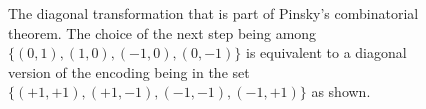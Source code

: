 \documentclass{article}
\begin{document}
\begin{figure}[h]
    \centering
    
    \caption{The diagonal transformation that is part of Pinsky's combinatorial theorem. The choice of the next step being among \(\{(0,1),(1,0),(-1,0),(0,-1)\}\) is equivalent to a diagonal version of the encoding being in the set \(\{(+1,+1),(+1,-1),(-1,-1),(-1,+1)\}\) as shown.}
    \label{fig:diagonal_transformation}
\end{figure}
\end{document}
